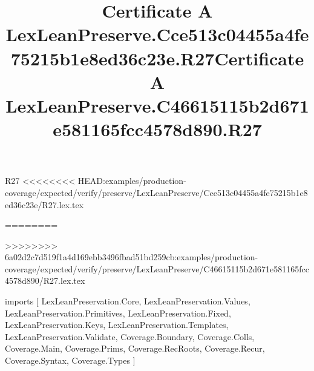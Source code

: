 \begin{lexlean}{R27}
<<<<<<<< HEAD:examples/production-coverage/expected/verify/preserve/LexLeanPreserve/Cce513c04455a4fe75215b1e8ed36c23e/R27.lex.tex
\title{Certificate A LexLeanPreserve.Cce513c04455a4fe75215b1e8ed36c23e.R27}
========
\title{Certificate A LexLeanPreserve.C46615115b2d671e581165fcc4578d890.R27}
>>>>>>>> 6a02d2c7d519f1a4d169ebb3496fbad51bd259cb:examples/production-coverage/expected/verify/preserve/LexLeanPreserve/C46615115b2d671e581165fcc4578d890/R27.lex.tex
\begin{coremodule}
imports [
  LexLeanPreservation.Core,
  LexLeanPreservation.Values,
  LexLeanPreservation.Primitives,
  LexLeanPreservation.Fixed,
  LexLeanPreservation.Keys,
  LexLeanPreservation.Templates,
  LexLeanPreservation.Validate,
  Coverage.Boundary,
  Coverage.Colls,
  Coverage.Main,
  Coverage.Prims,
  Coverage.RecRoots,
  Coverage.Recur,
  Coverage.Syntax,
  Coverage.Types
]


\end{coremodule}
\end{lexlean}
